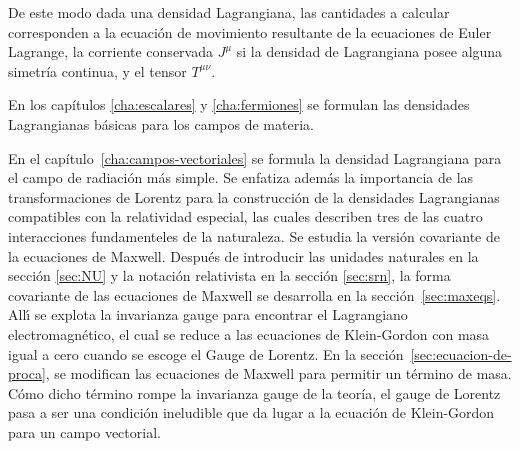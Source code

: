 De este modo dada una densidad Lagrangiana, las cantidades a calcular corresponden a la ecuación de movimiento resultante de la ecuaciones de Euler Lagrange, la corriente conservada $J^\mu$ si la densidad de Lagrangiana posee alguna simetría continua, y el tensor $T^{\mu\nu}$. 



En los capítulos \ref{cha:escalares} y \ref{cha:fermiones} se formulan las densidades Lagrangianas básicas para los campos de materia.

En el capítulo~\ref{cha:campos-vectoriales} se formula la densidad Lagrangiana para el campo de radiación más simple. Se enfatiza además la importancia de las transformaciones de Lorentz para la construcción de la densidades Lagrangianas compatibles con la relatividad especial, las cuales describen tres de las cuatro interacciones fundamenteles de la naturaleza.
Se estudia la versión covariante de la ecuaciones de Maxwell. Después de introducir las unidades naturales en la sección \ref{sec:NU} y la notación relativista en la sección \ref{sec:srn}, la forma covariante de las ecuaciones de Maxwell se desarrolla en la sección~\ref{sec:maxeqs}. All\'\i{} se explota la invarianza gauge para encontrar el Lagrangiano electromagnético, el cual se reduce a las ecuaciones de Klein-Gordon con masa igual a cero cuando se escoge el Gauge de Lorentz. En la sección~\ref{sec:ecuacion-de-proca}, se modifican las ecuaciones de Maxwell para permitir un término de masa. Cómo dicho término rompe la invarianza gauge de la teoría, el gauge de Lorentz pasa a ser una condición ineludible que da lugar a la ecuación de Klein-Gordon para un campo vectorial.

